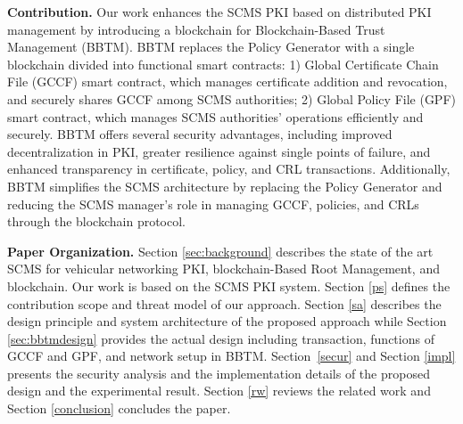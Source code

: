 \textbf{Contribution.}
Our work enhances the SCMS PKI based on distributed PKI management by introducing a blockchain for Blockchain-Based Trust Management (BBTM). BBTM replaces the Policy Generator with a single blockchain divided into functional smart contracts: 1) Global Certificate Chain File (GCCF) smart contract, which manages certificate addition and revocation, and securely shares GCCF among SCMS authorities; 2) Global Policy File (GPF) smart contract, which manages SCMS authorities' operations efficiently and securely. BBTM offers several security advantages, including improved decentralization in PKI, greater resilience against single points of failure, and enhanced transparency in certificate, policy, and CRL transactions. Additionally, BBTM simplifies the SCMS architecture by replacing the Policy Generator and reducing the SCMS manager's role in managing GCCF, policies, and CRLs through the blockchain protocol. 


\textbf{Paper Organization.}
Section \ref{sec:background} describes the state of the art SCMS for vehicular networking PKI, blockchain-Based Root Management, and blockchain. Our work is based on the SCMS PKI system. Section \ref{ps} defines the contribution scope and threat model of our approach. Section \ref{sa} describes the design principle and system architecture of the proposed approach while Section \ref{sec:bbtmdesign} provides the actual design including transaction, functions of GCCF and GPF, and network setup in BBTM. Section~\ref{secur} and Section \ref{impl} presents the security analysis and the implementation details of the proposed design and the experimental result. Section \ref{rw} reviews the related work and Section \ref{conclusion} concludes the paper.







